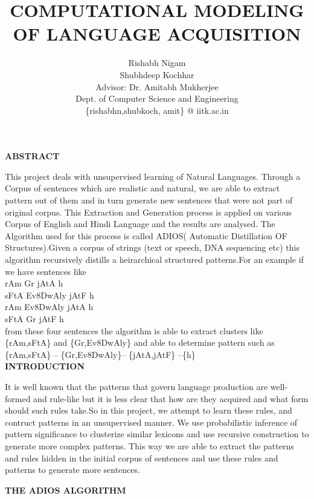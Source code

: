 \def\DevnagVersion{2.15}\documentclass[14 pt]{article}
\title  {\bf  COMPUTATIONAL MODELING OF LANGUAGE ACQUISITION}
\author{\large  Rishabh Nigam \\
 Shubhdeep Kochhar \\
Advisor: Dr. Amitabh Mukherjee \\
Dept. of Computer Science and Engineering \\
\{rishabhn,shubkoch, amit\} @ iitk.ac.in }
\begin{document}
\maketitle

{\Large \center \bf ABSTRACT  \\}

This project deals with unsupervised learning of Natural Languages. Through a Corpus of sentences which are realistic and natural, we are able to extract pattern out of them and in turn generate new sentences that were not part of original corpus. This Extraction and Generation process is applied on various Corpus of English and Hindi Language and the results are analysed. The Algorithm used for this process is called ADIOS( Automatic Distillation OF Structures).Given a corpus of strings (text or speech, DNA sequencing etc) this algorithm recursively distills a heirarchical structured patterns.For an example if we have sentences like\\
{\dn rAm Gr jAtA h\4}\\
{\dn sFtA Ev\38DwAly jAtF h\4} \\
{\dn rAm Ev\38DwAly jAtA h\4} \\
{\dn sFtA Gr jAtF h\4}\\

from these four sentences the algorithm is able to extract clusters like \{{\dn rAm{\rs ,\re}sFtA}\} and \{{\dn Gr{\rs ,\re}Ev\38DwAly}\} and able to determine pattern such as\\
 \{{\dn rAm{\rs ,\re}sFtA}\} -- \{{\dn Gr{\rs ,\re}Ev\38DwAly}\}-- \{{\dn jAtA{\rs ,\re}jAtF}\} --\{{\dn h\4}\}  \\

   

{\Large \center \bf INTRODUCTION  \\}

It is well known that the patterns that govern language production are well-formed and rule-like but it is less clear that how are they acquired and what form should such rules take.So in this project, we attempt to learn these rules, and contruct patterns in an unsupervised manner.    
We use probabilistic inference of pattern significance to clusterize similar lexicons and use recursive construction to generate more complex patterns. This way we are able to extract the patterns and rules hidden in the initial corpus of sentences and use these rules and patterns to generate more sentences. 

{\Large \center \bf THE ADIOS ALGORITHM  \\}
\end{document}
